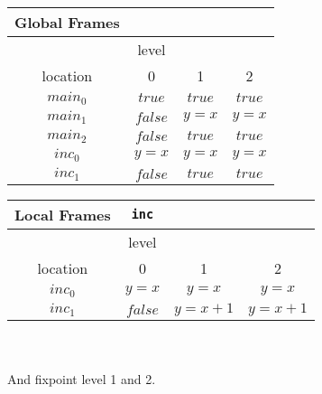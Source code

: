 \documentclass{article}
\newcommand\mycom[1]{}
\newcommand\mycom[1]{#1}
\newcommand{\jw}[1]{\mycom{\todo[color=blue!40,inline]{\small JW: #1}}}
\begin{document}
\begin{minipage}{.4\textwidth}
	\setlength\tabcolsep{0.35em}
	\begin{center}
		\begin{tabu}{cccc}
			Global Frames \\
			\toprule
			& level \\
			\cmidrule(lr){2-2}
			location & 0 & 1 & 2 \\
			$main_0$ & $true$ & $true$ & $true$  \\
			$main_1$ & $false$ & $y = x$ & $y = x$\\
			$main_2$ & $false$ & $true$ & $true$ \\
			$inc_0$ & $y = x$ & $y = x$ & $y = x$ \\
			$inc_1$ & $false$ & $true$ & $true$\\
			\bottomrule
		\end{tabu}
	\end{center}
\end{minipage}
\hfill
\begin{minipage}{.5\textwidth}
	\setlength\tabcolsep{0.35em}
	\begin{center}
		\begin{tabu}{cccc}
			Local Frames & \texttt{inc}\\
			\toprule
			& level \\
			\cmidrule(lr){2-4}
			location & 0 & 1 & 2\\
			$inc_0$ & $y = x$ & $y = x$ & $y = x$  \\
			$inc_1$ & $false$ & $y = x + 1$  & $y = x + 1$\\
			\bottomrule
		\end{tabu}
	\end{center}	
\end{minipage} \\ \\

And fixpoint level 1 and 2. \\ 
\jw{TODO the rest.}
	
	
	
	
	
	\pagebreak
\end{document}
